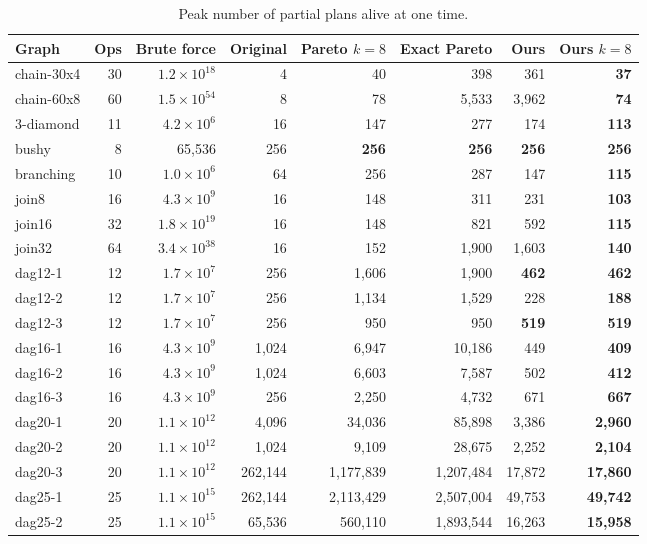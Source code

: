 \documentclass[10pt,a4paper]{article}
\begin{document}
\begin{longtable}{@{}lrr|rrrrr@{}}
\caption{Peak number of partial plans alive at one time.}\label{tab:peak}\\
\toprule
Graph & Ops & Brute force & Original & Pareto $k{=}8$ & Exact Pareto & \textbf{Ours} & Ours $k{=}8$\\
\midrule\endhead
chain-30x4 & 30 & $1.2\times10^{18}$ & 4 & 40 & 398 & 361 & \textbf{37}\\
chain-60x8 & 60 & $1.5\times10^{54}$ & 8 & 78 & 5{,}533 & 3{,}962 & \textbf{74}\\
3-diamond & 11 & $4.2\times10^{6}$ & 16 & 147 & 277 & 174 & \textbf{113}\\
bushy & 8 & 65{,}536 & 256 & \textbf{256} & \textbf{256} & \textbf{256} & \textbf{256}\\
branching & 10 & $1.0\times10^{6}$ & 64 & 256 & 287 & 147 & \textbf{115}\\
join8 & 16 & $4.3\times10^{9}$ & 16 & 148 & 311 & 231 & \textbf{103}\\
join16 & 32 & $1.8\times10^{19}$ & 16 & 148 & 821 & 592 & \textbf{115}\\
join32 & 64 & $3.4\times10^{38}$ & 16 & 152 & 1{,}900 & 1{,}603 & \textbf{140}\\
dag12-1 & 12 & $1.7\times10^{7}$ & 256 & 1{,}606 & 1{,}900 & \textbf{462} & \textbf{462}\\
dag12-2 & 12 & $1.7\times10^{7}$ & 256 & 1{,}134 & 1{,}529 & 228 & \textbf{188}\\
dag12-3 & 12 & $1.7\times10^{7}$ & 256 & 950 & 950 & \textbf{519} & \textbf{519}\\
dag16-1 & 16 & $4.3\times10^{9}$ & 1{,}024 & 6{,}947 & 10{,}186 & 449 & \textbf{409}\\
dag16-2 & 16 & $4.3\times10^{9}$ & 1{,}024 & 6{,}603 & 7{,}587 & 502 & \textbf{412}\\
dag16-3 & 16 & $4.3\times10^{9}$ & 256 & 2{,}250 & 4{,}732 & 671 & \textbf{667}\\
dag20-1 & 20 & $1.1\times10^{12}$ & 4{,}096 & 34{,}036 & 85{,}898 & 3{,}386 & \textbf{2{,}960}\\
dag20-2 & 20 & $1.1\times10^{12}$ & 1{,}024 & 9{,}109 & 28{,}675 & 2{,}252 & \textbf{2{,}104}\\
dag20-3 & 20 & $1.1\times10^{12}$ & 262{,}144 & 1{,}177{,}839 & 1{,}207{,}484 & 17{,}872 & \textbf{17{,}860}\\
dag25-1 & 25 & $1.1\times10^{15}$ & 262{,}144 & 2{,}113{,}429 & 2{,}507{,}004 & 49{,}753 & \textbf{49{,}742}\\
dag25-2 & 25 & $1.1\times10^{15}$ & 65{,}536 & 560{,}110 & 1{,}893{,}544 & 16{,}263 & \textbf{15{,}958}\\
\bottomrule
\end{longtable}
\end{document}
